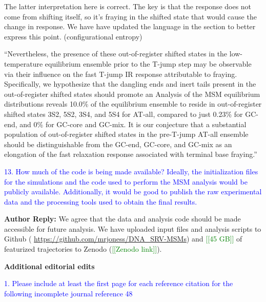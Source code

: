 \documentclass[11pt,a4paper]{letter} %
\newcommand*{\rood}[1]{{\color{red}{#1}}}
\newcommand*{\noteg}[1]{\textcolor{green}{[[#1]]}}		%
\begin{document}

The latter interpretation here is correct. The key is that the response does not come from shifting itself, so it’s fraying in the shifted state that would cause the change in response. We have have updated the language in the section to better express this point. (configurational entropy)

``Nevertheless, the presence of these out-of-register shifted states in the low-temperature equilibrium ensemble prior to the T-jump step may be observable via their influence on the fast T-jump IR response attributable to fraying. Specifically, we hypothesize that the dangling ends and inert tails present in the out-of-register shifted states should promote an \rood{elevated fraying response over the course of the relaxation that is distinct from that of in-register fraying. This heterogeneity of configurations should lead to heterogeneous dynamics, manifested in the observation of a more stretched relaxation over experimental time scales of 70-100 ns.} Analysis of the MSM equilibrium distributions reveals 10.0\% of the equilibrium ensemble to reside in out-of-register shifted states 3S2, 5S2, 3S4, and 5S4 for AT-all, compared to just 0.23\% for GC-end, and 0\% for GC-core and GC-mix. It is our conjecture that a substantial population of out-of-register shifted states in the pre-T-jump AT-all ensemble should be distinguishable from the GC-end, GC-core, and GC-mix as an elongation of the fast relaxation response associated with terminal base fraying.''

\textcolor{blue}{13. How much of the code is being made available? Ideally, the initialization files for the simulations and the code used to perform the MSM analysis would be publicly available. Additionally, it would be good to publish the raw experimental data and the processing tools used to obtain the final results.}

\textbf{Author Reply:}   We agree that the data and analysis code should be made accessible for future analysis. We have uploaded input files and analysis scripts to Github ( \url{https://github.com/mrjoness/DNA_SRV-MSMs}) and  \noteg{45 GB} of featurized trajectories to Zenodo (\noteg{Zenodo link}).

\begin{shaded}
\textbf{Additional editorial edits}
\end{shaded}

\textcolor{blue}{1. Please include at least the first page for each reference citation for the following incomplete journal reference 48}
\end{document}
